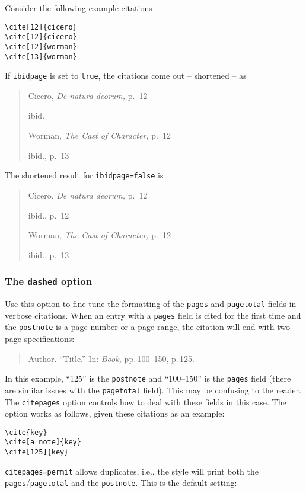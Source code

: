 \documentclass[a4paper]{article}
\begin{document}
Consider the following example citations
\begin{verbatim}
\cite[12]{cicero}
\cite[12]{cicero}
\cite[12]{worman}
\cite[13]{worman}
\end{verbatim}
%
If \texttt{ibidpage} is set to \texttt{true}, the citations
come out -- shortened -- as
\begin{quote}
Cicero, \emph{De natura deorum,} p.~12

ibid.

Worman, \emph{The Cast of Character,} p.~12

ibid., p.~13
\end{quote}
%
The shortened result for \texttt{ibidpage=false} is
\begin{quote}
Cicero, \emph{De natura deorum,} p.~12

ibid., p.~12

Worman, \emph{The Cast of Character,} p.~12

ibid., p.~13
\end{quote}

\subsubsection*{The \texttt{dashed} option}

Use this option to fine-tune the formatting of the \texttt{pages}
and \texttt{pagetotal} fields in verbose citations. When an entry
with a \texttt{pages} field is cited for the first time and the
\texttt{postnote} is a page number or a page range, the citation
will end with two page specifications:

\begin{quote}
Author. \enquote{Title.} In: \emph{Book,} pp.\,100--150, p.\,125.
\end{quote}
%
In this example, \enquote{125} is the \texttt{postnote} and
\enquote{100--150} is the \texttt{pages} field (there are similar
issues with the \texttt{pagetotal} field). This may be confusing to
the reader. The \texttt{citepages} option controls how to deal with
these fields in this case. The option works as follows, given these
citations as an example:

\begin{verbatim}
\cite{key}
\cite[a note]{key}
\cite[125]{key}
\end{verbatim}
%
\texttt{citepages=permit} allows duplicates, i.e., the style will
print both the \texttt{pages}\slash \texttt{pagetotal} and the
\texttt{postnote}. This is the default setting:
\end{document}
